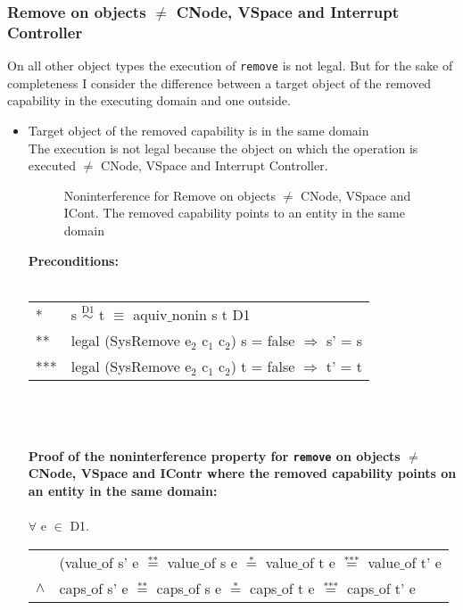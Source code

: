 \subsubsection{Remove on objects $\neq$ CNode, VSpace and Interrupt Controller} 
On all other object types the execution of \texttt{remove} is not legal. But for the sake of completeness I consider the difference between a target object of the removed capability in the executing domain and one outside.
\begin{itemize}
\item Target object of the removed capability is in the same domain \\
The execution is not legal because the object on which the operation is executed $\neq$ CNode, VSpace and Interrupt Controller.
\begin{flushleft}
\begin{figure}[H]
\caption{Noninterference for Remove on objects $\neq$ CNode, VSpace and ICont. The removed capability points to an entity in the same domain}
\label{fig:RemoveOthers}
\end{figure}
\end{flushleft}
\textbf{Preconditions:} \\ \\
\begin{tabular}{ll}
* & s $\overset{\text{D1}}{\sim}$ t $\equiv$ aquiv$\_$nonin s t D1	\\ 
** & legal (SysRemove e$_2$ c$_1$ c$_2$) s = false $\Rightarrow$ s' = s \\ 
*** & legal (SysRemove e$_2$ c$_1$ c$_2$) t = false $\Rightarrow$ t' = t
\end{tabular} \\ \\ \\
\textbf{Proof of the noninterference property for \texttt{remove} on objects $\neq$ CNode, VSpace and IContr where the removed capability points on an entity in the same domain:}\\ \\
$\forall$ e $\in$ D1. \\
\begin{tabular}{ll}
& (value$\_$of s' e $\overset{\text{**}}{=}$ value$\_$of s e $\overset{\text{*}}{=}$ value$\_$of t e $\overset{\text{***}}{=}$ value$\_$of t' e \\
$\wedge$ & caps$\_$of s' e $\overset{\text{**}}{=}$ caps$\_$of s e $\overset{\text{*}}{=}$ caps$\_$of t e $\overset{\text{***}}{=}$ caps$\_$of t' e \\

\end{tabular}
\end{itemize}
